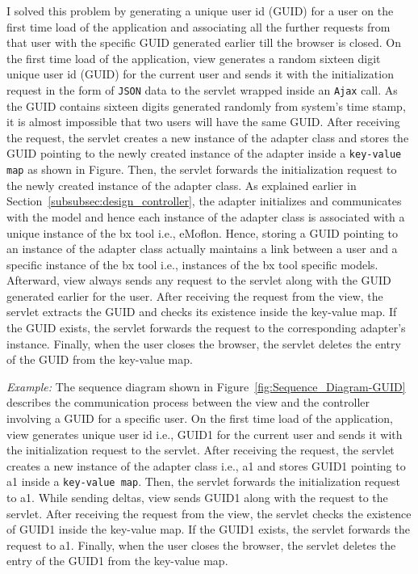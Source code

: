 I solved this problem by generating a unique user id (GUID) for a user on the first time load of the application and associating all the further requests from that user with the specific GUID generated earlier till the browser is closed. On the first time load of the application, view generates a random sixteen digit unique user id (GUID) for the current user and sends it with the initialization request in the form of \texttt{JSON} data to the servlet wrapped inside an \texttt{Ajax} call. As the GUID contains sixteen digits generated randomly from system's time stamp, it is almost impossible that two users will have the same GUID. After receiving the request, the servlet creates a new instance of the adapter class and stores the GUID pointing to the newly created instance of the adapter inside a \texttt{key-value map} as shown in Figure. Then, the servlet forwards the initialization request to the newly created instance of the adapter class. As explained earlier in Section~\ref{subsubsec:design_controller}, the adapter initializes and communicates with the model and hence each instance of the adapter class is associated with a unique instance of the bx tool i.e., eMoflon. Hence, storing a GUID pointing to an instance of the adapter class actually maintains a link between a user and a specific instance of the bx tool i.e., instances of the bx tool specific models. Afterward, view always sends any request to the servlet along with the GUID generated earlier for the user. After receiving the request from the view, the servlet extracts the GUID and checks its existence inside the  key-value map. If the GUID exists, the servlet forwards the request to the corresponding adapter's instance. Finally, when the user closes the browser, the servlet deletes the entry of the GUID from the key-value map.

\textit{Example:} The sequence diagram shown in Figure~\ref{fig:Sequence_Diagram-GUID} describes the communication process between the view and the controller involving a GUID for a specific user. On the first time load of the application, view generates unique user id i.e., GUID1 for the current user and sends it with the initialization request to the servlet. After receiving the request, the servlet creates a new instance of the adapter class i.e., a1 and stores GUID1 pointing to a1 inside a \texttt{key-value map}. Then, the servlet forwards the initialization request to a1. While sending deltas, view sends GUID1 along with the request to the servlet. After receiving the request from the view, the servlet checks the existence of GUID1 inside the key-value map. If the GUID1 exists, the servlet forwards the request to a1. Finally, when the user closes the browser, the servlet deletes the entry of the GUID1 from the key-value map.


